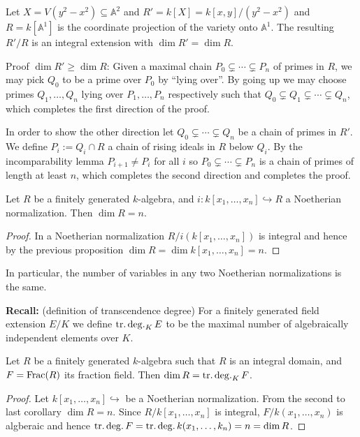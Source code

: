 \documentclass[11pt,a4paper]{article}
\newcommand{\A}{\mathbb A}
\begin{document}
\begin{example}
    Let $X = V(y^2 - x^2) \subseteq \A^2$
    and $R' = k[X] = k[x,y]/(y^2-x^2)$
    and $R = k[\A^1]$
    is the coordinate projection of the variety
    onto $\A^1$.
    The resulting $R'/R$ is an integral extension
    with $\dim R' = \dim R$.

Proof $\dim R' \geq \dim R$:
Given a maximal chain $P_0 \subsetneq \cdots \subsetneq P_n$ of primes in $R$,
we may pick $Q_0$ to be a prime over $P_0$ by
``lying over''.
By going up we may choose primes $Q_1,\dots,Q_n$
lying over $P_1,\dots,P_n$ respectively such that
$Q_0 \subsetneq Q_1 \subsetneq \cdots \subsetneq Q_n$,
which completes the first direction of the proof.


In order to show the other direction let
$Q_0 \subsetneq \cdots \subsetneq Q_n$
be a chain of primes in $R'$.
We define $P_i := Q_i \cap R$ a chain of rising
ideals in $R$ below $Q_i$.
By the incomparability lemma $P_{i+1} \neq P_i$
for all $i$ so $P_0 \subsetneq \cdots \subsetneq P_n$
is a chain of primes of length at least $n$,
which completes the second direction and completes
the proof.
\end{example}

\begin{corollary}
    Let $R$ be a finitely generated $k$-algebra,
    and $i \colon k[x_1,\dots,x_n] \hookrightarrow R$
    a Noetherian normalization.
    Then $\dim R = n$.
\end{corollary}
\begin{proof}
    In a Noetherian normalization
    $R / i(k[x_1,\dots,x_n])$ is integral
    and hence by the previous proposition
    $\dim R = \dim k[x_1,\dots,x_n] = n$.
\end{proof}

\begin{remark}
    In particular, the number
    of variables in any two Noetherian normalizations
    is the same.

    \textbf{Recall:} (definition of transcendence
    degree) For a finitely generated field extension
    $E/K$ we define $\operatorname{tr.deg.}_K E$ to be
    the maximal number of algebraically independent
    elements over $K$.
\end{remark}

\begin{corollary}
Let $R$ be a finitely generated $k$-algebra
such that $R$ is an integral domain,
and $F = \operatorname{Frac}(R)$ its fraction field.
Then $\dim R = \operatorname{tr.deg.}_K F$.
\end{corollary}
\begin{proof}
Let $k[x_1,\dots,x_n] \hookrightarrow$ be a Noetherian
normalization.
From the second to last corollary $\dim R = n$.
Since $R/k[x_1,\dots,x_n]$ is integral,
$F/k(x_1,\dots,x_n)$ is algberaic
and hence $\operatorname{tr.deg.} F = \operatorname{tr.deg.} k(x_1,\dots,k_n) = n = \dim R$.
\end{proof}
\end{document}
